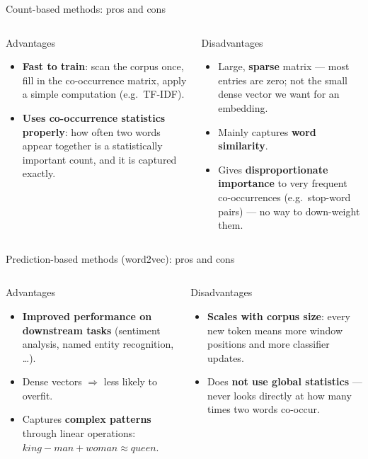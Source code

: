 \documentclass[aspectratio=169,11pt]{beamer}
\begin{document}
\begin{frame}{Count-based methods: pros and cons}
\begin{columns}[T]
\begin{block}{\textcolor{okc}{Advantages}}
\begin{itemize}
  \item \textbf{Fast to train}: scan the corpus once, fill in the
        co-occurrence matrix, apply a simple computation (e.g.\ TF-IDF).
  \item \textbf{Uses co-occurrence statistics properly}: how often two words
        appear together is a statistically important count, and it is
        captured exactly.
\end{itemize}
\end{block}
\begin{block}{\textcolor{warn}{Disadvantages}}
\begin{itemize}
  \item Large, \textbf{sparse} matrix --- most entries are zero; not the
        small dense vector we want for an embedding.
  \item Mainly captures \textbf{word similarity}.
  \item Gives \textbf{disproportionate importance} to very frequent
        co-occurrences (e.g.\ stop-word pairs) --- no way to down-weight them.
\end{itemize}
\end{block}
\end{columns}
\end{frame}

\begin{frame}{Prediction-based methods (word2vec): pros and cons}
\begin{columns}[T]
\begin{block}{\textcolor{okc}{Advantages}}
\begin{itemize}
  \item \textbf{Improved performance on downstream tasks} (sentiment
        analysis, named entity recognition, \ldots).
  \item Dense vectors $\Rightarrow$ less likely to overfit.
  \item Captures \textbf{complex patterns} through linear operations:
        $\textit{king} - \textit{man} + \textit{woman} \approx \textit{queen}$.
\end{itemize}
\end{block}
\begin{block}{\textcolor{warn}{Disadvantages}}
\begin{itemize}
  \item \textbf{Scales with corpus size}: every new token means more window
        positions and more classifier updates.
  \item Does \textbf{not use global statistics} --- never looks directly at
        how many times two words co-occur.
\end{itemize}
\end{block}
\end{columns}
\end{frame}
\end{document}
